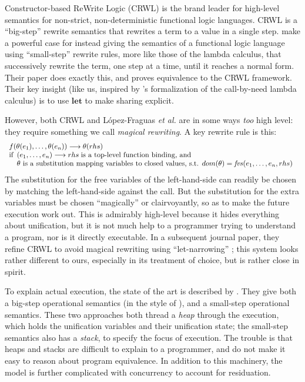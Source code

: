 \documentclass[acmsmall]{acmart}
\newcommand{\etal}{\emph{et al.}\xspace}
\begin{document}
Constructor-based ReWrite Logic (CRWL) \cite{crwl} is the brand leader for
high-level semantics for non-strict, non-deterministic functional logic languages.
%
CRWL is a ``big-step'' rewrite semantics that rewrites a term to a value in a single
step.
%
 make a powerful case for instead giving the semantics
of a functional logic language using ``small-step'' rewrite rules, more like those
of the lambda calculus, that successively rewrite the term, one step at
a time, until it reaches a normal form.
Their paper does exactly this, and proves equivalence to the
CRWL framework.  Their key insight (like us, inspired by
\citet{ariola:call-by-need}'s formalization of the call-by-need lambda calculus)
is to use \ensuremath{\mathbf{let}} to make sharing explicit.

However, both CRWL and L\'opez-Fraguas {\etal} are in some ways \emph{too} high level:
they require something we call \emph{magical rewriting}. A key rewrite rule is this:
$$
\begin{array}{l}
f( \theta(e_1),\ldots, \theta(e_n) ) \longrightarrow \theta( rhs ) \\
\text{if}
\begin{array}[t]{l}
  (e_1, \ldots, e_n) \longrightarrow rhs
   \; \text{is a top-level function binding, and} \\
\text{$\theta$ is a substitution mapping variables to closed values, s.t.
$dom(\theta) = \mathit{fvs}(e_1, \ldots, e_n, rhs)$}
\end{array}
\end{array}
$$
The substitution for the free variables of the left-hand-side can
readily be chosen by matching the left-hand-side against the call.
But the substitution for the extra variables must be chosen ``magically''
\cite[Section 7]{fraguas:rewriting} or clairvoyantly, so as to make the future execution
work out. This is admirably high-level because it hides everything
about unification, but it is not much help to a programmer trying to
understand a program, nor is it directly executable.
In a subsequent journal paper, they refine CRWL to avoid magical rewriting using
``let-narrowing'' \cite[Section 6]{fraguas:let-narrowing}; this system
looks rather different to ours, especially in its treatment of choice,
but is rather close in spirit.

To explain actual execution, the state of the art is described by
\citet{hanus:semantics}.  They give both a big-step operational
semantics (in the style of \citet{launchbury:natural}), and
a small-step operational semantics.  These two approaches both thread a
\emph{heap} through the execution, which holds the unification variables and their unification
state; the small-step semantics also has a \emph{stack}, to specify
the focus of execution.
%
The trouble is that heaps and stacks are difficult to explain to a programmer,
and do not make it easy to reason about program equivalence.
%
In addition to this machinery, the model is further complicated with
concurrency to account for residuation.
\end{document}
